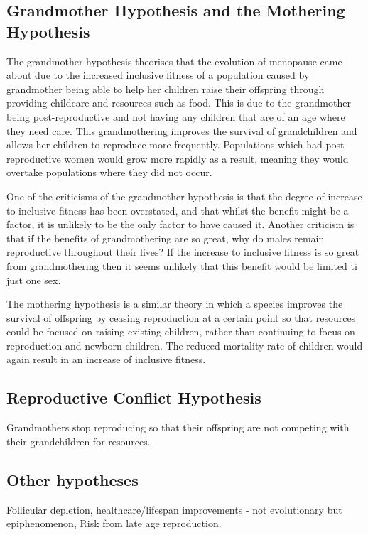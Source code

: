 \documentclass[authoryearcitations]{UoYCSproject}
\begin{document}
\subsection{Grandmother Hypothesis and the Mothering Hypothesis}
The grandmother hypothesis \cite{grandmother2000} theorises that the evolution of menopause came about due to the increased inclusive fitness of a population caused by grandmother being able to help her children raise their offspring through providing childcare and resources such as food. This is due to the grandmother being post-reproductive and not having any children that are of an age where they need care. This grandmothering improves the survival of grandchildren and allows her children to reproduce more frequently. Populations which had post-reproductive women would grow more rapidly as a result, meaning they would overtake populations where they did not occur. 

One of the criticisms of the grandmother hypothesis is that the degree of increase to inclusive fitness has been overstated, and that whilst the benefit might be a factor, it is unlikely to be the only factor to have caused it. Another criticism is that if the benefits of grandmothering are so great, why do males remain reproductive throughout their lives? If the increase to inclusive fitness is so great from grandmothering then it seems unlikely that this benefit would be limited ti just one sex.

The mothering hypothesis is a similar theory in which a species improves the survival of offspring by ceasing reproduction at a certain point so that resources could be focused on raising existing children, rather than continuing to focus on reproduction and newborn children. The reduced mortality rate of children would again result in an increase of inclusive fitness.

\subsection{Reproductive Conflict Hypothesis}
Grandmothers stop reproducing so that their offspring are not competing with their grandchildren for resources. \cite{repConflictOrca2017}

\subsection{Other hypotheses}
Follicular depletion, healthcare/lifespan improvements - not evolutionary but epiphenomenon, Risk from late age reproduction.
\end{document}
